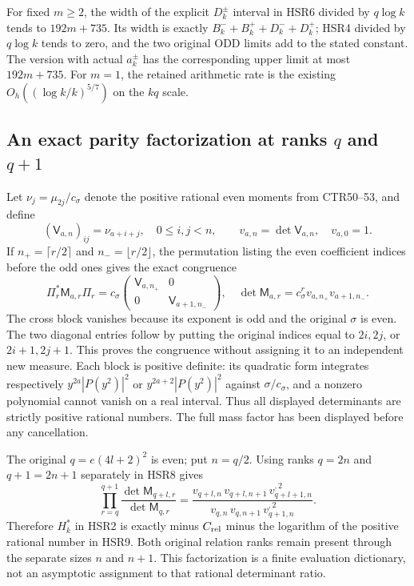 For fixed $m\geq2$, the width of the explicit $D_k^\pm$
interval in HSR6 divided by $q\log k$ tends to
$192m+735$. Its width is exactly
$B_k^-+B_k^++D_k^-+D_k^+$; HSR4 divided by $q\log k$
tends to zero, and the two original ODD limits add to the
stated constant. The version with actual $a_k^\pm$ has
the corresponding upper limit at most $192m+735$.
For $m=1$, the retained arithmetic rate is the existing
$O_h((\log k/k)^{5/7})$ on the $kq$ scale.

\subsection{An exact parity factorization at ranks $q$ and $q+1$}

Let $\nu_j=\mu_{2j}/c_\sigma$ denote the positive rational
even moments from CTR50--53, and define
\[
 (\mathsf V_{a,n})_{ij}=\nu_{a+i+j},\quad 0\leq i,j<n,
 \qquad v_{a,n}=\det\mathsf V_{a,n},\quad v_{a,0}=1.
\]
If $n_+=\lceil r/2\rceil$ and $n_-=\lfloor r/2\rfloor$,
the permutation listing the even coefficient indices before
the odd ones gives the exact congruence
\[
 \Pi_r^*\mathsf M_{a,r}\Pi_r
 =c_\sigma\begin{pmatrix}
      \mathsf V_{a,n_+}&0\\0&\mathsf V_{a+1,n_-}
                    \end{pmatrix},\quad
 \det\mathsf M_{a,r}=c_\sigma^r v_{a,n_+}v_{a+1,n_-}.
 \tag{HSR8}
\]
The cross block vanishes because its exponent is odd and the
original $\sigma$ is even. The two diagonal entries follow
by putting the original indices equal to $2i,2j$, or
$2i+1,2j+1$. This proves the congruence without assigning
it to an independent new measure. Each block is positive
definite: its quadratic form integrates respectively
$y^{2a}|P(y^2)|^2$ or $y^{2a+2}|P(y^2)|^2$ against
$\sigma/c_\sigma$, and a nonzero polynomial cannot vanish
on a real interval. Thus all displayed determinants are
strictly positive rational numbers. The full mass factor
has been displayed before any cancellation.

The original $q=e(4l+2)^2$ is even; put $n=q/2$.
Using ranks $q=2n$ and $q+1=2n+1$ separately in HSR8 gives
\[
 \prod_{r=q}^{q+1}\frac{\det\mathsf M_{q+l,r}}
                             {\det\mathsf M_{q,r}}
 =\frac{v_{q+l,n}\,v_{q+l,n+1}\,v_{q+l+1,n}^{,2}}
        {v_{q,n}\,v_{q,n+1}\,v_{q+1,n}^{,2}}.
 \tag{HSR9}
\]
Therefore $H_k^*$ in HSR2 is exactly minus $C_{\rm rel}$
minus the logarithm of the positive rational number in
HSR9. Both original relation ranks remain present through
the separate sizes $n$ and $n+1$. This factorization is a
finite evaluation dictionary, not an asymptotic assignment
to that rational determinant ratio.
